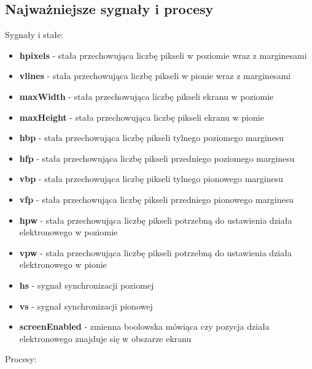\documentclass[a4paper]{report}
\begin{document}
		\subsection{Najważniejsze sygnały i procesy}
			{\Large Sygnały i stałe:}
			\begin{itemize}
				\item \textbf{hpixels} - stała przechowująca liczbę pikseli w poziomie wraz z marginesami
				\item \textbf{vlines} - stała przechowująca liczbę pikseli w pionie wraz z marginesami
				\item \textbf{maxWidth} - stała przechowująca liczbę pikseli ekranu w poziomie
				\item \textbf{maxHeight} - stała przechowująca liczbę pikseli ekranu w pionie
				\item \textbf{hbp} - stała przechowująca liczbę pikseli tylnego poziomego marginesu
				\item \textbf{hfp} - stała przechowująca liczbę pikseli przedniego poziomego marginesu
				\item \textbf{vbp} - stała przechowująca liczbę pikseli tylnego pionowego marginesu
				\item \textbf{vfp} - stała przechowująca liczbę pikseli przedniego pionowego marginesu
				\item \textbf{hpw} - stała przechowująca liczbę pikseli potrzebną do ustawienia działa elektronowego w poziomie
				\item \textbf{vpw} - stała przechowująca liczbę pikseli potrzebną do ustawienia działa elektronowego w pionie
				\item \textbf{hs} - sygnał synchronizacji poziomej
				\item \textbf{vs} - sygnał synchronizacji pionowej
				\item \textbf{screenEnabled} - zmienna boolowska mówiąca czy pozycja działa elektronowego znajduje się w obszarze ekranu
			\end{itemize}
			{\Large Procesy:}
\end{document}
